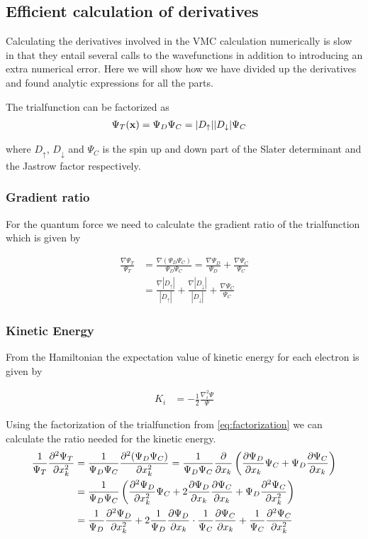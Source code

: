 \documentclass[x11names]{article}
\begin{document}
	

	

		\subsection{Efficient calculation of derivatives}
		Calculating the derivatives involved in the VMC calculation numerically is slow in that they entail several calls to the wavefunctions in addition to introducing an extra numerical error. Here we will show how we have divided up the derivatives and found analytic expressions for all the parts.

		The trialfunction can be factorized as
		\begin{align}
			\Psi_T(\vb{x}) &= \Psi_{D} \Psi_C= |D_\uparrow| |D_\downarrow| \Psi_C \label{eq:factorization}
		\end{align}

		where \(D_\uparrow\), \(D_\downarrow\) and \(\Psi_C\) is the spin up and down part of the Slater determinant and the Jastrow factor respectively.

		\subsubsection{Gradient ratio}
			For the quantum force we need to calculate the gradient ratio of the trialfunction which is given by

			\begin{align}
				\frac{\nabla \Psi_T}{ \Psi_T } &= \frac{\nabla( \Psi_D\Psi_C  )}{ \Psi_D\Psi_C } = \frac{ \nabla \Psi_D }{\Psi_D } + \frac{\nabla \Psi_C}{\Psi_C}
				\\
				&= \frac{\nabla |D_\uparrow|}{|D_\uparrow|} + \frac{ \nabla |D_\downarrow|}{|D_\downarrow|} + \frac{\nabla \Psi_C}{\Psi_C}
			\end{align}

		\subsubsection{Kinetic Energy}
			From the Hamiltonian the expectation value of kinetic energy for each electron is given by

			\begin{align}
				K_i &= - \frac{1}{2} \frac{\nabla^2_i \Psi}{\Psi}
			\end{align}

				Using the factorization of the trialfunction from \eqref{eq:factorization} we can calculate the ratio needed for the kinetic energy.
			\begin{align}
				\frac{1}{\Psi_T}\pdv[2]{\Psi_T}{x_k} &= \frac{1}{\Psi_D\Psi_C} \pdv[2]{(\Psi_D\Psi_C)}{x_k} = \frac{1}{\Psi_D\Psi_C} \pdv{}{x_k} \left( \pdv{\Psi_D}{x_k} \Psi_C +\Psi_D \pdv{\Psi_C}{x_k} \right)
				\\
				&= \frac{ 1 }{\Psi_D\Psi_C} \left( \pdv[2]{\Psi_D}{x_k} \Psi_C   + 2 \pdv{ \Psi_D }{x_k}\pdv{ \Psi_C }{x_k} + \Psi_D\pdv[2]{\Psi_C}{x_k} \right)
				\\
				&= \frac{1}{\Psi_D}\pdv[2]{\Psi_D}{x_k}  + 2 \frac{1}{\Psi_D} \pdv{ \Psi_D }{x_k} \cdot \frac{1}{\Psi_C}\pdv{ \Psi_C }{x_k} +  \frac{1}{\Psi_C}\pdv[2]{\Psi_C}{x_k} \label{eq:laplacianIntermediate}
			\end{align}
\end{document}
